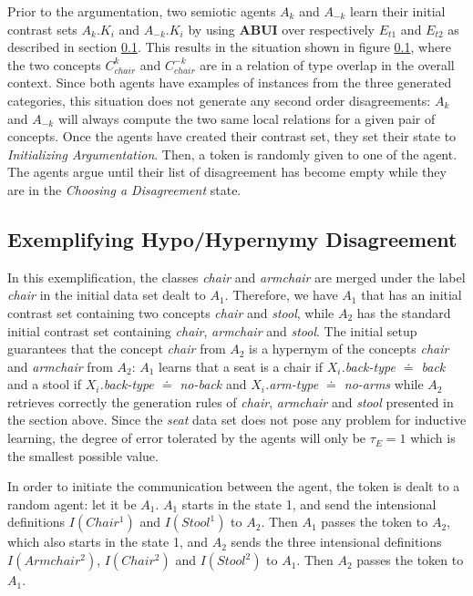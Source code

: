 Prior to the argumentation, two semiotic agents $A_{k}$ and $A_{-k}$ learn their initial contrast sets $A_{k}.K_{i}$ and $A_{-k}.K_{i}$ by using \textbf{ABUI} over respectively $E_{t1}$ and $E_{t2}$ as described in section \ref{}. This results in the situation shown in figure \ref{}, where the two concepts $C_{chair}^{k}$ and $C_{chair}^{-k}$ are in a relation of type overlap in the overall context. Since both agents have examples of instances from the three generated categories, this situation does not generate any second order disagreements: $A_{k}$ and $A_{-k}$ will always compute the two same local relations for a given pair of concepts. Once the agents have created their contrast set, they set their state to \emph{Initializing Argumentation}. Then, a token is randomly given to  one of the agent. The agents argue until their list of disagreement has become empty while they are in the \emph{Choosing a Disagreement} state.

\subsection{Exemplifying  Hypo/Hypernymy Disagreement}

In this exemplification, the classes \emph{chair} and \emph{armchair} are merged under the label \emph{chair} in the initial data set dealt to $A_{1}$. Therefore, we have $A_{1}$ that has an initial contrast set containing two concepts \emph{chair} and \emph{stool}, while $A_{2}$ has the standard initial contrast set containing \emph{chair}, \emph{armchair} and \emph{stool}. The initial setup guarantees that the concept \emph{chair} from $A_{2}$ is a hypernym of the concepts \emph{chair} and \emph{armchair} from $A_{2}$: $A_{1}$ learns that a seat is a chair if \emph{$X_{i}$.back-type $\doteq$ back} and a stool if \emph{$X_{i}$.back-type $\doteq$ no-back} and \emph{$X_{i}$.arm-type $\doteq$ no-arms} while $A_{2}$ retrieves correctly the generation rules of \emph{chair}, \emph{armchair} and \emph{stool} presented in the section above. Since the \emph{seat} data set does not pose any problem for inductive learning, the degree of error tolerated by the agents will only be $\tau_{E} = 1$ which is the smallest possible value.

In order to initiate the communication between the agent, the token is dealt to a random agent: let it be $A_{1}$. $A_{1}$ starts in the state 1, and send the intensional definitions $I(Chair^{1})$ and $I(Stool^{1})$ to $A_{2}$. Then $A_{1}$ passes the token to $A_{2}$, which also starts in the state 1, and $A_{2}$ sends the three intensional definitions $I(Armchair^{2})$, $I(Chair^{2})$ and $I(Stool^{2})$ to $A_{1}$. Then $A_{2}$ passes the token to $A_{1}$.

